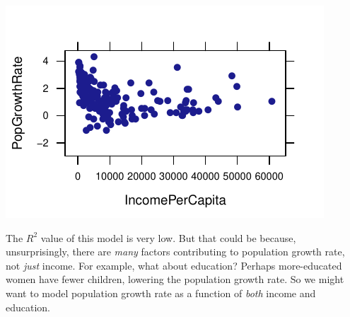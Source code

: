 \documentclass[twoside]{book}\usepackage[]{graphicx}\usepackage[]{xcolor}
\makeatletter
\def\maxwidth{ %
  \ifdim\Gin@nat@width>\linewidth
    \linewidth
  \else
    \Gin@nat@width
  \fi
}
\newenvironment{knitrout}{}{} %
\newcounter{example}[section]
\makeatother
\begin{document}
\begin{knitrout}
{\centering \includegraphics[width=\maxwidth]{figures/fig-who_slm-1} 

}



\end{knitrout}

The $R^2$ value of this model is very low. But that could be because, unsurprisingly, there are \emph{many} factors contributing to population growth rate, not \emph{just} income.  For example, what about education? Perhaps more-educated women have fewer children, lowering the population growth rate.  So we might want to model population growth rate as a function of \emph{both} income and education.
\end{document}
